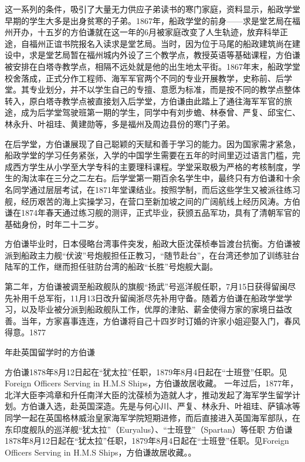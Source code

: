 \documentclass[12pt,UTF8]{ctexbook}
\begin{document}
这一系列的条件，吸引了大量无力供应子弟读书的寒门家庭，资料显示，船政学堂早期的学生大多是出身贫寒的子弟。1867年，船政学堂的前身——求是堂艺局在福州开办，十五岁的方伯谦就在这一年的6月被家庭改变了人生轨迹，放弃科举正途，自福州正谊书院报名入读求是堂艺局。当时，因为位于马尾的船政建筑尚在建设中，求是堂艺局暂在福州城内外设了三个教学点，教授英语等基础课程，方伯谦被安排在白塔寺教学点，相隔不远处就是他的出生地太平街。1867年末，船政学堂校舍落成，正式分作工程师、海军军官两个不同的专业开展教学，史称前、后学堂。其专业划分，并不以学生自己的专擅、意愿为标准，而是按不同的教学点整体转入，原白塔寺教学点被直接划入后学堂，方伯谦由此踏上了通往海军军官的旅途，成为后学堂驾驶班第一期的学生，同学中有刘步蟾、林泰曾、严复、邱宝仁、林永升、叶祖珪、黄建勋等，多是福州及周边县份的寒门子弟。

在后学堂，方伯谦展现了自己聪颖的天赋和善于学习的能力。因为国家需才紧急，船政学堂的学习任务紧张，入学的中国学生需要在五年的时间里迈过语言门槛，完成西方学生从小学至大学专科的主要理科课程。学堂采取极为严格的考核制度，学生的淘汰率在三分之二左右。后学堂第一期百余名学生中，最终只有方伯谦和十余名同学通过层层考试，在1871年堂课结业。按照学制，而后这些学生又被派往练习舰，经历艰苦的海上实操学习，在营口至新加坡之间的广阔航线上经历风涛。方伯谦在1874年春天通过练习舰的测评，正式毕业，获颁五品军功，具有了清朝军官的基础身份，时年二十二岁。

方伯谦毕业时，日本侵略台湾事件突发，船政大臣沈葆桢奉旨渡台抗衡。方伯谦被派到船政主力舰“伏波”号炮舰担任正教习，“随节赴台”，在台湾还参加了训练驻台陆军的工作，继而担任驻防台湾的船政“长胜”号炮舰大副。

第二年，方伯谦被调至船政舰队的旗舰“扬武”号巡洋舰任职，7月15日获得留闽尽先补用千总军衔，11月13日改升留闽浙尽先补用守备。随着方伯谦在船政学堂学习，以及毕业被分派到船政舰队工作，优厚的津贴、薪金使得方家的家境日益改善。当年，方家喜事连连，方伯谦将自己十四岁时订婚的许家小姐迎娶入门，春风得意。1877


年赴英国留学时的方伯谦

方伯谦1878年8月12日起在“犹太拉”任职，1879年8月4日起在“士班登”任职。见Foreign Officers Serving in H.M.S Ships，方伯谦故居收藏。
一年过后，1877年，北洋大臣李鸿章和升任南洋大臣的沈葆桢为造就人才，推动发起了海军学生留学计划。方伯谦入选，赴英国深造。先是与何心川、严复、林永升、叶祖珪、萨镇冰等同学一起在英国格林威治皇家海军学院短期进修，而后直接进入英国海军部队，在东印度舰队的巡洋舰“犹太拉”（Euryalus）、“士班登”（Spartan）等任职 方伯谦1878年8月12日起在“犹太拉”任职，1879年8月4日起在“士班登”任职。见Foreign Officers Serving in H.M.S Ships，方伯谦故居收藏。。
\end{document}
